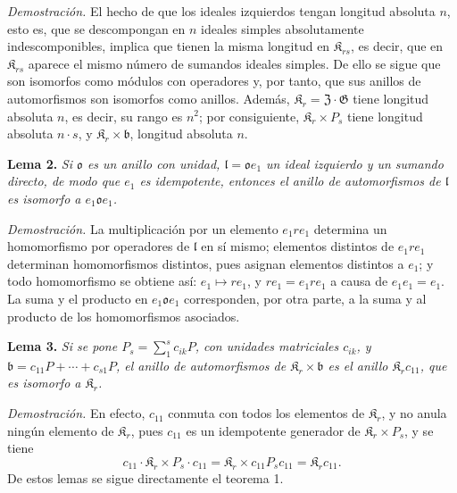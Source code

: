 \noindent\emph{Demostración.} El hecho de que los ideales izquierdos tengan longitud absoluta \(n\), esto es, que se descompongan en \(n\) ideales simples absolutamente indescomponibles, implica que tienen la misma longitud en \(\mathfrak K_{rs}\), es decir, que en \(\mathfrak K_{rs}\) aparece el mismo número de sumandos ideales simples. De ello se sigue que son isomorfos como módulos con operadores y, por tanto, que sus anillos de automorfismos son isomorfos como anillos. Además, \(\mathfrak K_r=\mathfrak Z\cdot\mathfrak G\) tiene longitud absoluta \(n\), es decir, su rango es \(n^2\); por consiguiente, \(\mathfrak K_r\times P_s\) tiene longitud absoluta \(n\cdot s\), y \(\mathfrak K_r\times\mathfrak b\), longitud absoluta \(n\).

\noindent\textbf{Lema 2.} \emph{Si \(\mathfrak o\) es un anillo con unidad, \(\mathfrak l=\mathfrak o e_1\) un ideal izquierdo y un sumando directo, de modo que \(e_1\) es idempotente, entonces el anillo de automorfismos de \(\mathfrak l\) es isomorfo a \(e_1\mathfrak o e_1\).}

\noindent\emph{Demostración.} La multiplicación por un elemento \(e_1re_1\) determina un homomorfismo por operadores de \(\mathfrak l\) en sí mismo; elementos distintos de \(e_1re_1\) determinan homomorfismos distintos, pues asignan elementos distintos a \(e_1\); y todo homomorfismo se obtiene así: \(e_1\mapsto re_1\), y \(re_1=e_1re_1\) a causa de \(e_1e_1=e_1\). La suma y el producto en \(e_1\mathfrak o e_1\) corresponden, por otra parte, a la suma y al producto de los homomorfismos asociados.

\noindent\textbf{Lema 3.} \emph{Si se pone \(P_s=\sum_1^s c_{ik}P\), con unidades matriciales \(c_{ik}\), y \(\mathfrak b=c_{11}P+\cdots+c_{s1}P\), el anillo de automorfismos de \(\mathfrak K_r\times\mathfrak b\) es el anillo \(\mathfrak K_rc_{11}\), que es isomorfo a \(\mathfrak K_r\).}

\noindent\emph{Demostración.} En efecto, \(c_{11}\) conmuta con todos los elementos de \(\mathfrak K_r\), y no anula ningún elemento de \(\mathfrak K_r\), pues \(c_{11}\) es un idempotente generador de \(\mathfrak K_r\times P_s\), y se tiene
\[
c_{11}\cdot\mathfrak K_r\times P_s\cdot c_{11}
=\mathfrak K_r\times c_{11}P_sc_{11}
=\mathfrak K_rc_{11}.
\]
De estos lemas se sigue directamente el teorema 1.

